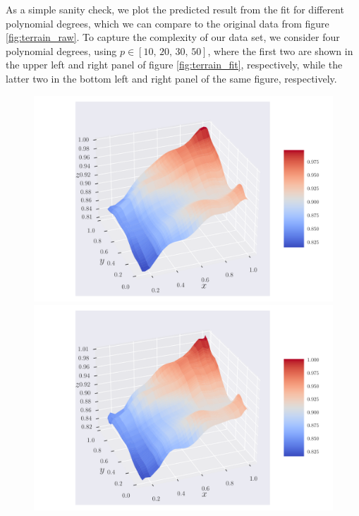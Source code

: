 \documentclass[reprint,english,notitlepage,aps,nobalancelastpage,nofootinbib]{revtex4-1}  %
\begin{document}
As a simple sanity check, we plot the predicted result from the fit for different polynomial degrees, which we can compare to the original data from figure \ref{fig:terrain_raw}. To capture the complexity of our data set, we consider four polynomial degrees, using $p\in[10,\,20,\,30,\,50]$, where the first two are shown in the upper left and right panel of figure \ref{fig:terrain_fit}, respectively, while the latter two in the bottom left and right panel of the same figure, respectively.

\begin{figure}[h]
	\includegraphics[width=\linewidth]{SRTM_prediction_p10.pdf}
	\endminipage\hfill
	\includegraphics[width=\linewidth]{SRTM_prediction_p20.pdf}
	\endminipage\hfill

\end{figure}
\end{document}

